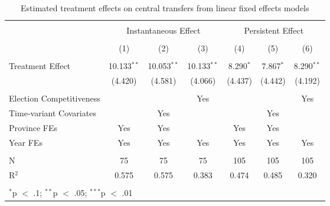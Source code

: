 
\begin{table}[!htbp] \centering 
  \caption{Estimated treatment effects on central transfers from linear fixed effects models} 
  \label{tab:lfe_main} 
\begin{tabular}{@{\extracolsep{5pt}}lcccccc} 
\\[-1.8ex]\hline 
\hline \\[-1.8ex] 
 & \multicolumn{3}{c}{Instantaneous Effect} & \multicolumn{3}{c}{Persistent Effect} \\ 
\\[-1.8ex] & (1) & (2) & (3) & (4) & (5) & (6)\\ 
\hline \\[-1.8ex] 
 Treatment Effect & 10.133$^{**}$ & 10.053$^{**}$ & 10.133$^{**}$ & 8.290$^{*}$ & 7.867$^{*}$ & 8.290$^{**}$ \\ 
  & (4.420) & (4.581) & (4.066) & (4.437) & (4.442) & (4.192) \\ 
 \hline \\[-1.8ex] 
Election Competitiveness &  &  & Yes &  &  & Yes \\ 
Time-variant Covariates &  & Yes &  &  & Yes &  \\ 
Province FEs & Yes & Yes &  & Yes & Yes &  \\ 
Year FEs & Yes & Yes & Yes & Yes & Yes & Yes \\ 
\hline \\[-1.8ex] 
N & 75 & 75 & 75 & 105 & 105 & 105 \\ 
R$^{2}$ & 0.575 & 0.575 & 0.383 & 0.474 & 0.485 & 0.320 \\ 
\hline 
\hline \\[-1.8ex] 
\multicolumn{7}{l}{$^{*}$p $<$ .1; $^{**}$p $<$ .05; $^{***}$p $<$ .01} \\ 
\end{tabular} 
\end{table} 
